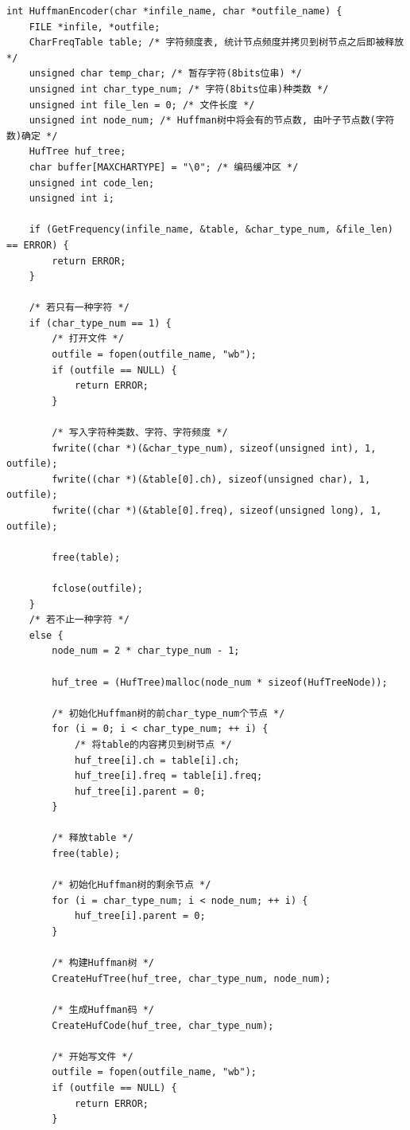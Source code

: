 \documentclass{ctexart}
\begin{document}
{\setmainfont{Courier New Bold}              
\begin{lstlisting}
int HuffmanEncoder(char *infile_name, char *outfile_name) {
    FILE *infile, *outfile;
    CharFreqTable table; /* 字符频度表, 统计节点频度并拷贝到树节点之后即被释放 */
    unsigned char temp_char; /* 暂存字符(8bits位串) */
    unsigned int char_type_num; /* 字符(8bits位串)种类数 */
    unsigned int file_len = 0; /* 文件长度 */
    unsigned int node_num; /* Huffman树中将会有的节点数, 由叶子节点数(字符数)确定 */
    HufTree huf_tree;
    char buffer[MAXCHARTYPE] = "\0"; /* 编码缓冲区 */
    unsigned int code_len;
    unsigned int i;

    if (GetFrequency(infile_name, &table, &char_type_num, &file_len) == ERROR) {
        return ERROR;
    }

    /* 若只有一种字符 */
    if (char_type_num == 1) {
        /* 打开文件 */
        outfile = fopen(outfile_name, "wb");
        if (outfile == NULL) {
            return ERROR;
        }

        /* 写入字符种类数、字符、字符频度 */
        fwrite((char *)(&char_type_num), sizeof(unsigned int), 1, outfile);
        fwrite((char *)(&table[0].ch), sizeof(unsigned char), 1, outfile);
        fwrite((char *)(&table[0].freq), sizeof(unsigned long), 1, outfile);

        free(table);

        fclose(outfile);
    }
    /* 若不止一种字符 */
    else {
        node_num = 2 * char_type_num - 1;

        huf_tree = (HufTree)malloc(node_num * sizeof(HufTreeNode));

        /* 初始化Huffman树的前char_type_num个节点 */
        for (i = 0; i < char_type_num; ++ i) {
            /* 将table的内容拷贝到树节点 */
            huf_tree[i].ch = table[i].ch;
            huf_tree[i].freq = table[i].freq;
            huf_tree[i].parent = 0;
        }

        /* 释放table */
        free(table);

        /* 初始化Huffman树的剩余节点 */
        for (i = char_type_num; i < node_num; ++ i) {
            huf_tree[i].parent = 0;
        }

        /* 构建Huffman树 */
        CreateHufTree(huf_tree, char_type_num, node_num);

        /* 生成Huffman码 */
        CreateHufCode(huf_tree, char_type_num);

        /* 开始写文件 */
        outfile = fopen(outfile_name, "wb");
        if (outfile == NULL) {
            return ERROR;
        }


\end{lstlisting}}
\end{document}
